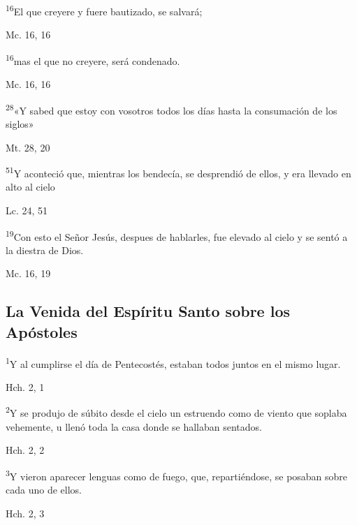 \documentclass[a4paper,11pt]{article}
\begin{document}
      \textsuperscript{16}El que creyere y fuere bautizado, se salvará;
      \begin{flushright}
        Mc. 16, 16
      \end{flushright}

      \textsuperscript{16}mas el que no creyere, será condenado.
      \begin{flushright}
        Mc. 16, 16
      \end{flushright}

      \textsuperscript{28}«Y sabed que estoy con vosotros todos los días hasta la consumación de los siglos»
      \begin{flushright}
        Mt. 28, 20
      \end{flushright}

      \textsuperscript{51}Y aconteció que, mientras los bendecía, se desprendió de ellos, y era llevado en alto al cielo
      \begin{flushright}
        Lc. 24, 51
      \end{flushright}

      \textsuperscript{19}Con esto el Señor Jesús, despues de hablarles, fue elevado al cielo y se sentó a la diestra de Dios.
      \begin{flushright}
        Mc. 16, 19
      \end{flushright}
    \subsection*{\hfil La Venida del Espíritu Santo sobre los Apóstoles \hfil}

      \textsuperscript{1}Y al cumplirse el día de Pentecostés, estaban todos juntos en el mismo lugar.
      \begin{flushright}
        Hch. 2, 1
      \end{flushright}

      \textsuperscript{2}Y se produjo de súbito desde el cielo un estruendo como de viento que soplaba vehemente, u llenó toda la casa
      donde se hallaban sentados.
      \begin{flushright}
        Hch. 2, 2
      \end{flushright}

      \textsuperscript{3}Y vieron aparecer lenguas como de fuego, que, repartiéndose, se posaban sobre cada uno de ellos.
      \begin{flushright}
        Hch. 2, 3
      \end{flushright}
\end{document}
